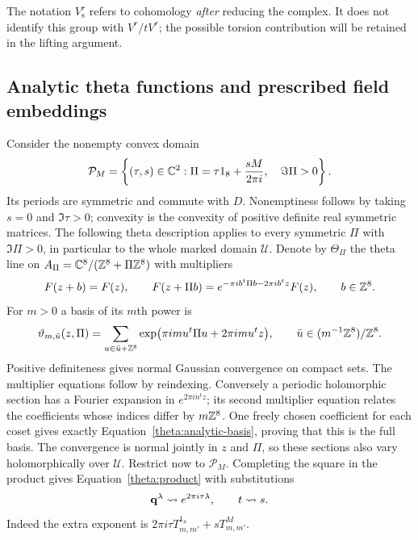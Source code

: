 The notation $V_{\mathrm s}^r$ refers to cohomology \emph{after} reducing the
complex.  It does not identify this group with $V^r/tV^r$; the possible
torsion contribution will be retained in the lifting argument.

\subsection{Analytic theta functions and prescribed field embeddings}

Consider the nonempty convex domain
\begin{equation}\label{theta:period-domain}
 \mathcal P_M=
 \left\{(\tau,s)\in\mathbb C^2:
    \Pi=\tau1_8+\frac{sM}{2\pi i},\quad\Im\Pi>0\right\}.
\end{equation}
Its periods are symmetric and commute with $D$.  Nonemptiness follows
by taking $s=0$ and $\Im\tau>0$; convexity is the convexity of positive
definite real symmetric matrices.  The following theta description applies
to every symmetric $\Pi$ with $\Im\Pi>0$, in particular to the whole
marked domain $\mathcal U$.  Denote by $\Theta_\Pi$ the theta line
on $A_\Pi=\mathbb C^8/(\mathbb Z^8+\Pi\mathbb Z^8)$ with multipliers
\[
 F(z+b)=F(z),\qquad
 F(z+\Pi b)=e^{-\pi i b^t\Pi b-2\pi i b^tz}F(z),
 \qquad b\in\mathbb Z^8.
\]
For $m>0$ a basis of its $m$th power is
\begin{equation}\label{theta:analytic-basis}
 \vartheta_{m,\bar u}(z,\Pi)
 =\sum_{u\in\bar u+\mathbb Z^8}
       \exp\bigl(\pi i m u^t\Pi u+2\pi i m u^tz\bigr),
 \qquad \bar u\in(m^{-1}\mathbb Z^8)/\mathbb Z^8.
\end{equation}
Positive definiteness gives normal Gaussian convergence on compact sets.
The multiplier equations follow by reindexing.  Conversely a periodic
holomorphic section has a Fourier expansion in $e^{2\pi i n^tz}$; its
second multiplier equation relates the coefficients whose indices differ
by $m\mathbb Z^8$.  One freely chosen coefficient for each coset gives exactly
Equation~\eqref{theta:analytic-basis}, proving that this is the full basis.
The convergence is normal jointly in $z$ and $\Pi$, so these sections
also vary holomorphically over $\mathcal U$.
Restrict now to $\mathcal P_M$.  Completing the square in the product gives
Equation~\eqref{theta:product} with substitutions
\begin{equation}\label{theta:analytic-substitution}
 \mathbf q^\lambda\rightsquigarrow e^{2\pi i\tau\lambda},
 \qquad t\rightsquigarrow s.
\end{equation}
Indeed the extra exponent is
$2\pi i\tau T^{1_8}_{m,m'}+sT^M_{m,m'}$.

